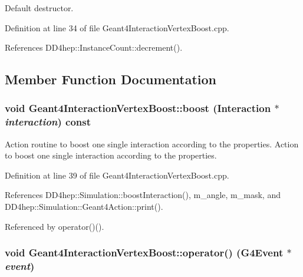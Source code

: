 Default destructor. 

Definition at line 34 of file Geant4InteractionVertexBoost.cpp.

References DD4hep::InstanceCount::decrement().

\subsection{Member Function Documentation}
\hypertarget{class_d_d4hep_1_1_simulation_1_1_geant4_interaction_vertex_boost_a33258e2ee3bc6a436f17bce6bd41f972}{
\subsubsection[{boost}]{\setlength{\rightskip}{0pt plus 5cm}void Geant4InteractionVertexBoost::boost ({\bf Interaction} $\ast$ {\em interaction}) const}}
\label{class_d_d4hep_1_1_simulation_1_1_geant4_interaction_vertex_boost_a33258e2ee3bc6a436f17bce6bd41f972}


Action routine to boost one single interaction according to the properties. Action to boost one single interaction according to the properties. 

Definition at line 39 of file Geant4InteractionVertexBoost.cpp.

References DD4hep::Simulation::boostInteraction(), m\_\-angle, m\_\-mask, and DD4hep::Simulation::Geant4Action::print().

Referenced by operator()().\hypertarget{class_d_d4hep_1_1_simulation_1_1_geant4_interaction_vertex_boost_ab66ab43b06523e720a1e377ecd065a66}{
\subsubsection[{operator()}]{\setlength{\rightskip}{0pt plus 5cm}void Geant4InteractionVertexBoost::operator() (G4Event $\ast$ {\em event})}}
\label{class_d_d4hep_1_1_simulation_1_1_geant4_interaction_vertex_boost_ab66ab43b06523e720a1e377ecd065a66}



